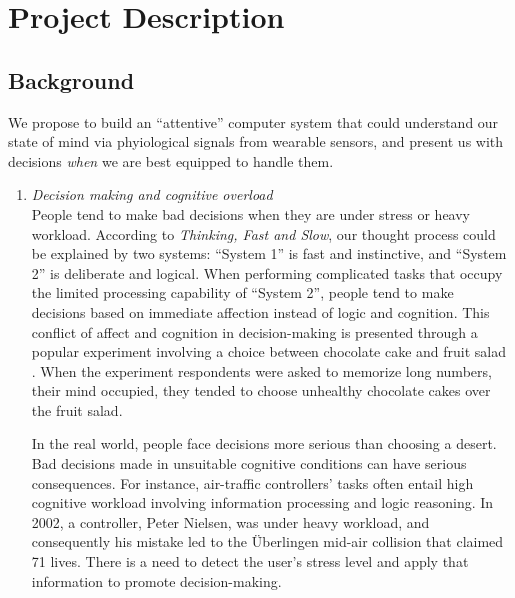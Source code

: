 \documentclass[12pt]{article}
\begin{document}


\section{Project Description}\label{project-description}

\subsection{Background}\label{background}

We propose to build an ``attentive'' computer system that could understand our state of mind via phyiological signals from wearable sensors, and present us with decisions {\it when} we are best equipped to handle them. 



\begin{enumerate}
\def\labelenumi{\noindent \alph{enumi}.}
\itemsep0pt\parskip0pt
\item{\it Decision making and cognitive overload}\\
  People tend to make bad decisions when they are under stress or heavy workload. 
  According to {\it Thinking, Fast and Slow}, our thought process could be explained by two systems: ``System 1'' is fast and instinctive, and ``System 2'' is deliberate and logical. When performing complicated tasks that occupy the limited processing capability of ``System 2'', people tend to make decisions based on immediate affection instead of logic and cognition. This conflict of affect and cognition in decision-making is presented through a popular experiment involving a choice between chocolate cake and fruit salad \cite{Fedorikhin2014}. When the experiment respondents were asked to memorize long numbers, their mind occupied, they tended to choose unhealthy chocolate cakes over the fruit salad. 


  \hspace{15pt} In the real world, people face decisions more serious than choosing a desert. Bad decisions made in unsuitable cognitive conditions can have serious consequences. For instance, air-traffic controllers' tasks often entail high cognitive workload involving information processing and logic reasoning. In 2002, a controller, Peter Nielsen, was under heavy workload, and consequently his mistake led to the \"{U}berlingen mid-air collision that claimed 71 lives. There is a need to detect the user's stress level and apply that information to promote decision-making.\\


\end{enumerate}
\end{document}

